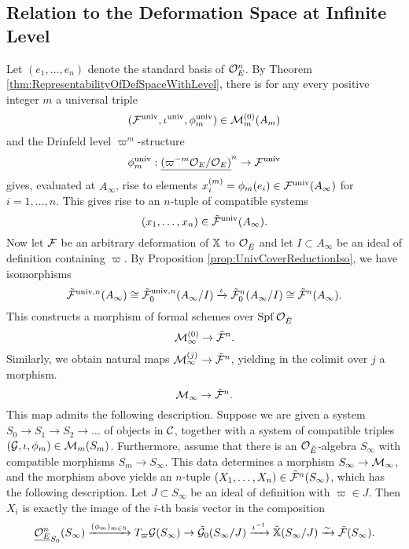 \documentclass[../main.tex]{subfiles}
\begin{document}


\subsection{Relation to the Deformation Space at Infinite Level} %
\label{ssub:Relation to the Deformation Space at Infinite Level}
Let $(e_1, \dots, e_n)$ denote the standard basis of $\mathcal{O}_E^n$. By 
Theorem \ref{thm:RepresentabilityOfDefSpaceWithLevel}, there is for any
every positive integer $m$ a universal triple 
$$(\mathcal{F}^{\mathrm{univ}}, \iota^{{\mathrm{univ}}}, \phi^{\mathrm{univ}}_m) \in \mathcal{M}_{m}^{(0)}(A_m)$$
and the Drinfeld level $\varpi^m$-structure 
\begin{equation*}
  \phi_m^{\mathrm{univ}}: \underline{(\varpi^{-m}\mathcal{O}_{E}/\mathcal{O}_E)}^n \to \mathcal{F}^{\mathrm{univ}}
\end{equation*}
gives, evaluated at $A_\infty$, rise to elements $x_i^{(m)} = \phi_m(e_i) \in
\mathcal{F}^{{\mathrm{univ}}}(A_\infty)$ for $i = 1, \dots, n$. 
This gives rise to an $n$-tuple 
of compatible systems
\begin{equation*}
  (x_1, \dots, x_n) \in \tilde {\mathcal{F}}^{\mathrm{univ}} (A_\infty). 
\end{equation*}
Now let $\mathcal{F}$ be an arbitrary deformation of $\mathbb{X}$ to $\mathcal{O}_{{\breve {E}}}$ and let $I \subset A_\infty$ be an ideal of definition
containing $\varpi$. By 
Proposition \ref{prop:UnivCoverReductionIso}, we have isomorphisms
\begin{equation*}
  \tilde {\mathcal{F}}^{{\mathrm{univ}},n}(A_\infty) \cong \tilde {\mathcal{F}}_0^{{\mathrm{univ}}, n}(A_\infty/I)
  \xrightarrow{\iota} \tilde {\mathcal{F}}_0^n(A_\infty/I)
  \cong \tilde {\mathcal{F}}^n(A_\infty).
\end{equation*}
This constructs a morphism of formal schemes over $\operatorname{Spf} \mathcal{O}_{\breve {E}}$
\begin{equation*} 
  \mathcal{M}_\infty^{(0)} \to \tilde {\mathcal{F}}^n.
\end{equation*}
Similarly, we obtain natural maps $\mathcal{M}_\infty^{(j)} \to \tilde {\mathcal{F}}^n$, yielding in the colimit over $j$ a morphism.
\begin{equation}\label{eq:MapFromMtoTildeF}
\mathcal{M}_\infty \to \tilde {\mathcal{F}}^n.
\end{equation}
This map admits the following description. 
Suppose we are given a system $S_0 \to S_1 \to S_2 \to \dots$ of objects in 
$\mathcal{C}$, together with a system of compatible triples 
$(\mathcal{G}, \iota, \phi_m) \in \mathcal{M}_m(S_m)$. Furthermore, assume that there
is an $\mathcal{O}_{\breve {E}}$-algebra 
$S_\infty$ with compatible morphisms $S_m \to S_\infty$. This data determines a 
morphism $S_\infty \to \mathcal{M}_\infty$, and the morphism above yields an $n$-tuple 
$(X_1, \dots, X_n) \in \tilde {\mathcal{F}}^n(S_\infty)$, which has the following description. Let $J \subset S_\infty$
be an ideal of definition with $\varpi \in J$. Then $X_i$ is exactly the image
of the $i$-th basis vector in the composition
\begin{equation*}
    \underline{\mathcal{O}_E^n}_{S_0}(S_\infty) \xrightarrow{(\phi_m)_{m \in \mathbb{N}}} T_\varpi \mathcal{G}(S_\infty) \to \tilde {\mathcal{G}}_0(S_\infty/J) \xrightarrow{\iota^{-1}} \tilde {\mathbb{X}}(S_\infty/J)
    \xrightarrow{\sim} \tilde {\mathcal{F}}(S_\infty).
\end{equation*}
\end{document}
